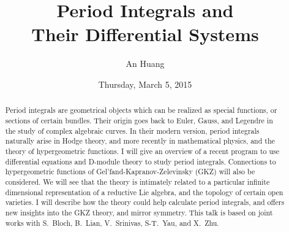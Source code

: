 \documentclass{UAmathtalk}
\author{An Huang}
\title{Period Integrals and\\ Their Differential Systems}
\date{Thursday, March 5, 2015}
\begin{document}
\maketitle

\begin{abstract}
Period integrals are geometrical objects which can be realized as special functions, or sections of certain bundles.
Their origin goes back to Euler, Gauss, and Legendre in the study of complex algebraic curves.
In their modern version, period integrals naturally arise in Hodge theory, and more recently in mathematical physics, and the theory of hypergeometric functions.
I will give an overview of a recent program to use differential equations and D-module theory to study period integrals.
Connections to hypergeometric functions of Gel'fand-Kapranov-Zelevinsky (GKZ) will also be considered.
We will see that the theory is intimately related to a particular infinite dimensional representation of a reductive Lie algebra, and the topology of certain open varieties.
I will describe how the theory could help calculate period integrals, and offers new insights into the GKZ theory, and mirror symmetry.
This talk is based on joint works with S.~Bloch, B.~Lian, V.~Srinivas, S-T.~Yau, and X.~Zhu.
\end{abstract}
\end{document}
